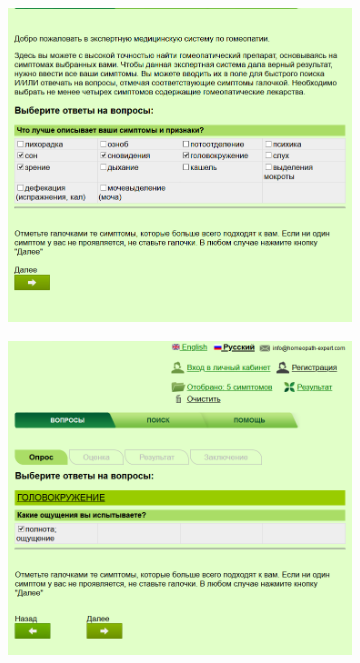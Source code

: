 \documentclass[
  a4paper,
  oneside,
  BCOR = 10mm,
  DIV = 12,
  12pt,
  headings = normal,
]{scrartcl}
\newlength{\gridunitwidth}
\begin{document}
      \begin{figure}[!htbp]
        \begin{subfigure}[b]{6 \gridunitwidth - 1em /2}
          \includegraphics[width = \columnwidth]{./assets/02.png}
          \caption{}
          \label{subfig:homeopathy-01}
        \end{subfigure}%
        \hspace{1em}%
        \begin{subfigure}[b]{6 \gridunitwidth - 1em /2}
          \includegraphics[width = \columnwidth]{./assets/03.png}

\end{subfigure}
\end{figure}
\end{document}
